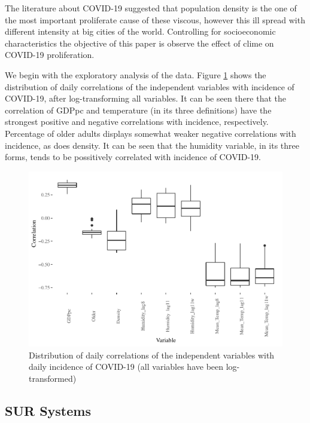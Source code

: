\documentclass[]{elsarticle} %
\makeatletter
\def\maxwidth{\ifdim\Gin@nat@width>\linewidth\linewidth
\else\Gin@nat@width\fi}
\let\Oldincludegraphics\includegraphics
\renewcommand{\includegraphics}[1]{\Oldincludegraphics[width=\maxwidth]{#1}}
\makeatother
\begin{document}
The literature about COVID-19 suggested that population density is the
one of the most important proliferate cause of these viscous, however
this ill spread with different intensity at big cities of the world.
Controlling for socioeconomic characteristics the objective of this
paper is observe the effect of clime on COVID-19 proliferation.

We begin with the exploratory analysis of the data. Figure
\ref{fig:daily-correlations} shows the distribution of daily
correlations of the independent variables with incidence of COVID-19,
after log-transforming all variables. It can be seen there that the
correlation of GDPpc and temperature (in its three definitions) have the
strongest positive and negative correlations with incidence,
respectively. Percentage of older adults displays somewhat weaker
negative correlations with incidence, as does density. It can be seen
that the humidity variable, in its three forms, tends to be possitively
correlated with incidence of COVID-19.

\begin{figure}
\centering
\includegraphics{Environmental-Correlates-of-COVID19-Spain_files/figure-latex/daily-correlations-1.pdf}
\caption{\label{fig:daily-correlations}Distribution of daily
correlations of the independent variables with daily incidence of
COVID-19 (all variables have been log-transformed)}
\end{figure}

\hypertarget{sur-systems}{%
\subsection{SUR Systems}\label{sur-systems}}
\end{document}
